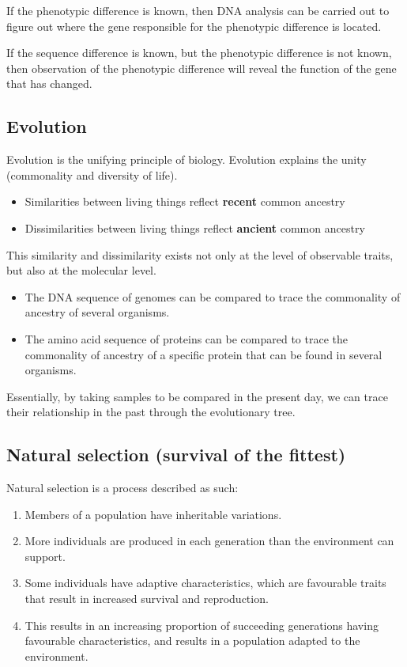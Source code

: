 \documentclass[11pt]{article}
\begin{document}
If the phenotypic difference is known, then DNA analysis can be carried out to figure out where the gene responsible for the phenotypic difference is located.


If the sequence difference is known, but the phenotypic difference is not known, then observation of the phenotypic difference will reveal the function of the gene that has changed.
\subsection{Evolution}
\label{sec:org5973daa}
Evolution is the unifying principle of biology. Evolution explains the unity (commonality and diversity of life).
\begin{itemize}
\item Similarities between living things reflect \textbf{recent} common ancestry
\item Dissimilarities between living things reflect \textbf{ancient} common ancestry
\end{itemize}

This similarity and dissimilarity exists not only at the level of observable traits, but also at the molecular level.
\begin{itemize}
\item The DNA sequence of genomes can be compared to trace the commonality of ancestry of several organisms.
\item The amino acid sequence of proteins can be compared to trace the commonality of ancestry of a specific protein that can be found in several organisms.
\end{itemize}

Essentially, by taking samples to be compared in the present day, we can trace their relationship in the past through the evolutionary tree.

\newpage
\subsection{Natural selection (survival of the fittest)}
\label{sec:orgf78fe64}
Natural selection is a process described as such:
\begin{enumerate}
\item Members of a population have inheritable variations.
\item More individuals are produced in each generation than the environment can support.
\item Some individuals have adaptive characteristics, which are favourable traits that result in increased survival and reproduction.
\item This results in an increasing proportion of succeeding generations having favourable characteristics, and results in a population adapted to the environment.
\end{enumerate}
\end{document}
